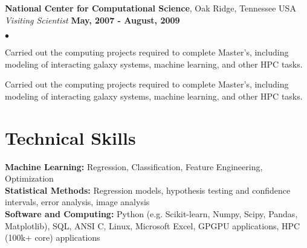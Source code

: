 \documentclass[margin,line, 11pt]{res}
\newenvironment{list2}{
  \begin{list}{$\bullet$}{%
      \setlength{\itemsep}{0in}
      \setlength{\parsep}{0in} \setlength{\parskip}{0in}
      \setlength{\topsep}{0in} \setlength{\partopsep}{0in} 
      \setlength{\leftmargin}{0.2in}}}{\end{list}}
\begin{document}
\begin{resume}
\textbf{National Center for Computational Science}, Oak Ridge, Tennessee USA\\
\textit{Visiting Scientist} \hfill \textbf{May, 2007 - August, 2009}\\
    \begin{list2}
    	\vspace*{-5mm}
    	\item Carried out the computing projects required to complete Master's, including modeling of interacting galaxy systems, machine learning, and other HPC tasks.
    	\item Carried out the computing projects required to complete Master's, including modeling of interacting galaxy systems, machine learning, and other HPC tasks.
    \end{list2}

\section{Technical Skills}
\textbf{Machine Learning:} Regression, Classification, Feature Engineering, Optimization\\
\textbf{Statistical Methods:} Regression models, hypothesis testing and confidence intervals, error analysis, image analysis\\
\textbf{Software and Computing:}  Python (e.g. Scikit-learn, Numpy, Scipy, Pandas, Matplotlib), SQL, ANSI C, Linux, Microsoft Excel, GPGPU applications, HPC (100k+ core) applications\\
\vspace*{-5mm}
\end{resume}
\end{document}
